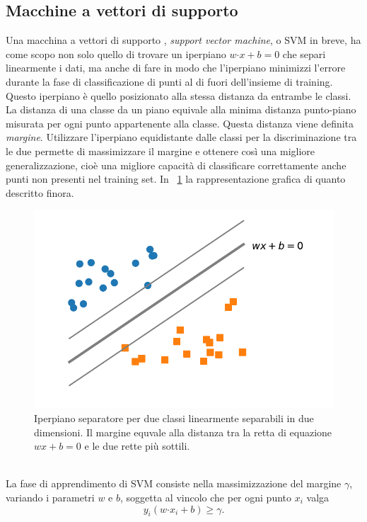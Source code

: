 \documentclass [11pt,a4paper,twoside,openright] {book}
\begin{document}
\subsection{Macchine a vettori di supporto}
Una macchina a vettori di supporto \cite{cortes1995support}, \textit{support vector machine}, o SVM in breve, ha come scopo non solo quello di trovare un iperpiano $w \boldsymbol{\cdot} x + b = 0$ che separi linearmente i dati, ma anche di fare in modo che l'iperpiano minimizzi l'errore durante la fase di classificazione di punti al di fuori dell'insieme di training. Questo iperpiano è quello posizionato alla stessa distanza da entrambe le classi. La distanza di una classe da un piano equivale alla minima distanza punto-piano misurata per ogni punto appartenente alla classe. Questa distanza viene definita \textit{margine}. Utilizzare l'iperpiano equidistante dalle classi per la discriminazione tra le due permette di massimizzare il margine e ottenere così una migliore generalizzazione, cioè una migliore capacità di classificare correttamente anche punti non presenti nel training set. In  \figurename~\ref{margine} la rappresentazione grafica di quanto descritto finora.
\begin{figure}[!h]
\centering
\includegraphics[scale=.6]{figure/margine.pdf}
\caption{Iperpiano separatore per due classi linearmente separabili in due dimensioni. Il margine equvale alla distanza tra la retta di equazione $wx + b = 0$ e le due rette più sottili.\label{margine}}
\end{figure}\\
La fase di apprendimento di SVM consiste nella massimizzazione del margine $\gamma$, variando i parametri $w$ e $b$, soggetta al vincolo che per ogni punto $x_i$ valga
\begin{equation}
y_i(w\boldsymbol{\cdot}x_i + b) \geq \gamma.
\end{equation}
\end{document}
